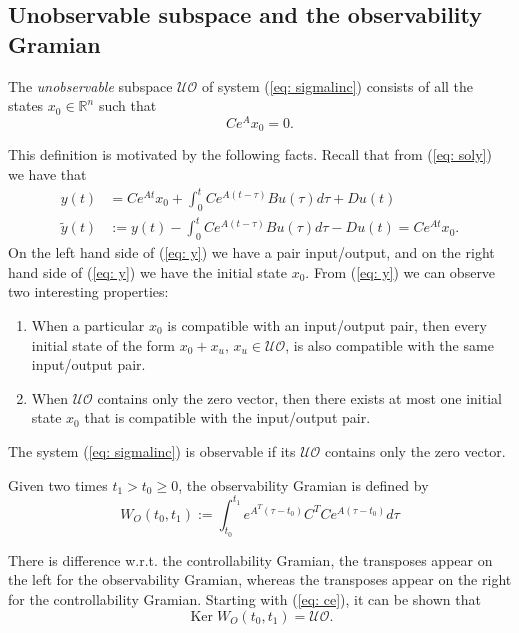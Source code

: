 \subsection{Unobservable subspace and the observability Gramian}
\begin{definition}
	The \emph{unobservable} subspace $\mathcal{UO}$ of system (\ref{eq: sigmalinc}) consists of all the states $x_0\in\mathbb{R}^n$ such that
	\begin{equation}
	C e^{A} x_0 = 0.
		\label{eq: ce}
	\end{equation}
\end{definition}
This definition is motivated by the following facts.
Recall that from (\ref{eq: soly}) we have that
\begin{align}
	y(t) &= Ce^{At}x_0 + \int_0^tCe^{A(t-\tau)}Bu(\tau)d\tau + Du(t) \nonumber \\
	\tilde y(t) &:= y(t) - \int_0^tCe^{A(t-\tau)}Bu(\tau)d\tau - Du(t) = Ce^{At}x_0. \label{eq: y}
\end{align}
On the left hand side of (\ref{eq: y}) we have a pair input/output, and on the right hand side of (\ref{eq: y}) we have the initial state $x_0$. From (\ref{eq: y}) we can observe two interesting properties:
\begin{enumerate}
	\item When a particular $x_0$ is compatible with an input/output pair, then every initial state of the form $x_0 + x_u, \, x_u\in\mathcal{UO}$, is also compatible with the same input/output pair.
	\item When $\mathcal{UO}$ contains only the zero vector, then there exists at most one initial state $x_0$ that is compatible with the input/output pair.
\end{enumerate}

\begin{definition}
	The system (\ref{eq: sigmalinc}) is observable if its $\mathcal{UO}$ contains only the zero vector.
\end{definition}

\begin{definition}
	Given two times $t_1>t_0\geq 0$, the observability Gramian is defined by
	\begin{equation}
		W_O(t_0,t_1) := \int_{t_0}^{t_1}e^{A^T(\tau - t_0)} C^T Ce^{A(\tau - t_0)}d\tau
	\end{equation}
\end{definition}
There is difference w.r.t. the controllability Gramian, the transposes appear on the left for the observability Gramian, whereas the transposes appear on the right for the controllability Gramian.
Starting with (\ref{eq: ce}), it can be shown that
\begin{equation}
	\operatorname{Ker}W_O(t_0,t_1) = \mathcal{UO}.
\end{equation}

